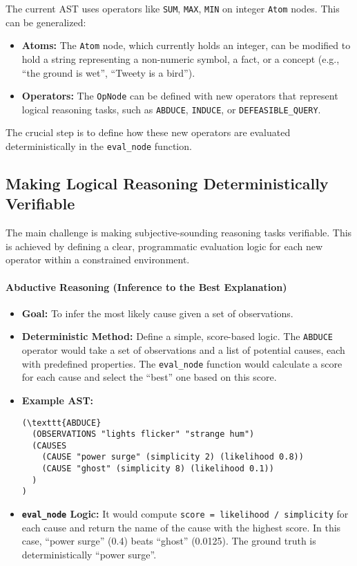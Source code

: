 \documentclass{article}
\begin{document}
The current AST uses operators like \texttt{SUM}, \texttt{MAX}, \texttt{MIN} on integer \texttt{Atom} nodes. This can be generalized:

\begin{itemize}
  \item \textbf{Atoms:} The \texttt{Atom} node, which currently holds an integer, can be modified to hold a string representing a non-numeric symbol, a fact, or a concept (e.g., ``the ground is wet'', ``Tweety is a bird'').
  \item \textbf{Operators:} The \texttt{OpNode} can be defined with new operators that represent logical reasoning tasks, such as \texttt{ABDUCE}, \texttt{INDUCE}, or \texttt{DEFEASIBLE\_QUERY}.
\end{itemize}

The crucial step is to define how these new operators are evaluated deterministically in the \texttt{eval\_node} function.

\subsection{Making Logical Reasoning Deterministically Verifiable}

The main challenge is making subjective-sounding reasoning tasks verifiable. This is achieved by defining a clear, programmatic evaluation logic for each new operator within a constrained environment.

\paragraph{Abductive Reasoning (Inference to the Best Explanation)}

\begin{itemize}
  \item \textbf{Goal:} To infer the most likely cause given a set of observations.
  \item \textbf{Deterministic Method:} Define a simple, score-based logic. The \texttt{ABDUCE} operator would take a set of observations and a list of potential causes, each with predefined properties. The \texttt{eval\_node} function would calculate a score for each cause and select the ``best'' one based on this score.
  \item \textbf{Example AST:}
        \begin{verbatim}
(\texttt{ABDUCE}
  (OBSERVATIONS "lights flicker" "strange hum")
  (CAUSES
    (CAUSE "power surge" (simplicity 2) (likelihood 0.8))
    (CAUSE "ghost" (simplicity 8) (likelihood 0.1))
  )
)
\end{verbatim}
  \item \textbf{\texttt{eval\_node} Logic:} It would compute \texttt{score = likelihood / simplicity} for each cause and return the name of the cause with the highest score. In this case, ``power surge'' (0.4) beats ``ghost'' (0.0125). The ground truth is deterministically ``power surge''.
\end{itemize}
\end{document}
